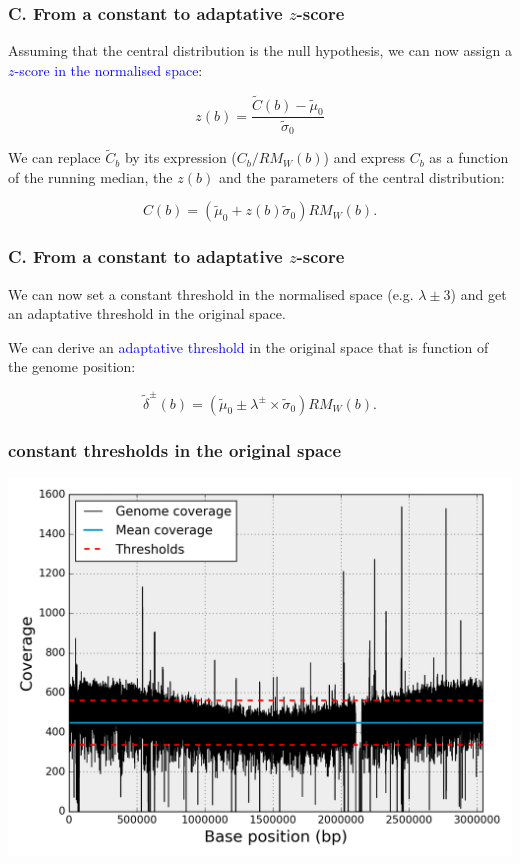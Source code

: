 \documentclass{beamer}
\begin{document}
\begin{frame}
\frametitle{C. From a constant to adaptative $z$-score}

Assuming that the central distribution is the null hypothesis, 
we can now  assign a \textcolor{blue}{$z$-score in the normalised space}:

\begin{equation}
z(b) = \frac{\widetilde{C}(b)-\widetilde{\mu}_0}{\widetilde{\sigma}_0}
\nonumber
\end{equation}

We can  replace $\widetilde{C}_b$ by its expression  ($C_b / RM_W(b)$) and
express $C_b$ as a function of the running median, the $z(b)$ and the parameters 
of the central distribution:

\begin{equation}
C(b) = \left(  \widetilde{\mu}_0  + z(b) \widetilde{\sigma}_0  \right)RM_W(b).
\nonumber
\end{equation}

\end{frame}

\begin{frame}
\frametitle{C. From a constant to adaptative $z$-score}
\begin{block}{}
We can now set a constant threshold in the normalised space (e.g. $\lambda \pm 3$) 
and get an adaptative threshold in the original space.
\end{block}

We can 
derive an \textcolor{blue}{adaptative threshold} in the 
original space that is function of the genome position: 

\begin{equation}
\tilde{\delta}^\pm(b) = \left( \widetilde{\mu}_0 \pm \lambda^\pm\times \widetilde{\sigma}_0    \right)RM_W(b).
\end{equation}

\end{frame}

\begin{frame}
 \frametitle{constant thresholds in the original space}
\includegraphics[height=0.9\textheight, 
    width=1\textwidth]{images/fig1.png}
 \end{frame}
\end{document}
